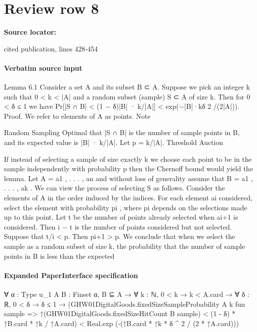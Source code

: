 \documentclass[10pt]{article}
\begin{document}
\section*{Review row 8}
\textbf{Source locator:} {\footnotesize\raggedright cited publication, lines 428-\allowbreak{}454\par}
\paragraph{Verbatim source input}
\begin{ReviewVerbatim}
Lemma 6.1 Consider a set A and its subset B ⊂ A.
Suppose we pick an integer k such that 0 < k < |A|
and a random subset (sample) S ⊂ A of size k. Then
for 0 < δ ≤ 1 we have
Pr[|S ∩ B| < (1 − δ)|B| · k/|A|] < exp(−|B|·kδ 2 /(2|A|)).
Proof. We refer to elements of A as points. Note

Random Sampling Optimal that |S ∩ B| is the number of sample points in B,
and its expected value is |B| · k/|A|. Let p = k/|A|.
Threshold Auction

If instead of selecting a sample of size exactly k we
choose each point to be in the sample independently
with probability p then the Chernoff bound would
yield the lemma.
Let A = {a1 , . . . , an } and without loss of generality assume that B = {a1 , . . . , ak }. We can view
the process of selecting S as follows. Consider the
elements of A in the order induced by the indices.
For each element ai considered, select the element
with probability pi , where pi depends on the selections made up to this point.
Let t be the number of points already selected when
ai+1 is considered. Then i − t is the number of points
considered but not selected. Suppose that t/i < p.
Then pi+1 > p.
We conclude that when we select the sample as a
random subset of size k, the probability that the number of sample points in B is less than the expected
\end{ReviewVerbatim}


\paragraph{Expanded PaperInterface specification}
\begin{ReviewVerbatim}
∀ {α : Type u_1} {A B : Finset α},
  B ⊆ A →
    ∀ {k : ℕ},
      0 < k →
        k < A.card →
          ∀ {δ : ℝ},
            0 < δ →
              δ ≤ 1 →
                (GHW01DigitalGoods.fixedSizeSampleProbability A k fun sample =>
                    ↑(GHW01DigitalGoods.fixedSizeHitCount B sample) < (1 - δ) * ↑B.card * ↑k / ↑A.card) <
                  Real.exp (-(↑B.card * ↑k * δ ^ 2 / (2 * ↑A.card)))
\end{ReviewVerbatim}
\end{document}
